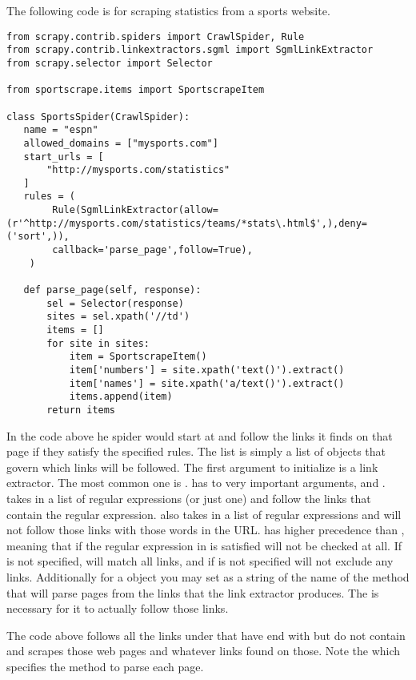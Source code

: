 The following code is for scraping statistics from a sports website.
\begin{lstlisting}
from scrapy.contrib.spiders import CrawlSpider, Rule
from scrapy.contrib.linkextractors.sgml import SgmlLinkExtractor
from scrapy.selector import Selector

from sportscrape.items import SportscrapeItem

class SportsSpider(CrawlSpider):
   name = "espn"
   allowed_domains = ["mysports.com"]
   start_urls = [
       "http://mysports.com/statistics"
   ]
   rules = (
        Rule(SgmlLinkExtractor(allow=(r'^http://mysports.com/statistics/teams/*stats\.html$',),deny=('sort',)),
		callback='parse_page',follow=True),
    )

   def parse_page(self, response):
       sel = Selector(response)
       sites = sel.xpath('//td')
       items = []
       for site in sites:
           item = SportscrapeItem()
           item['numbers'] = site.xpath('text()').extract()
           item['names'] = site.xpath('a/text()').extract()
           items.append(item)
       return items
\end{lstlisting}
In the code above he spider would start at  and follow the links it finds on that page if they satisfy the specified rules. 
The  list is simply a list of  objects that govern which links will be followed. 
The first argument to initialize  is a link extractor.
The most common one is .
 has to very important arguments,  and . 
 takes in a list of regular expressions (or just one) and follow the links that contain the regular expression. 
 also takes in a list of regular expressions and will not follow those links with those words in the URL. 
 has higher precedence than , meaning that if the regular expression in  is satisfied  will not be checked at all. 
If  is not specified,  will match all links, and if  is not specified  will not exclude any links. 
Additionally for a  object you may set  as a string of the name of the method that will parse pages from the links that the link extractor produces. 
The  is necessary for it to actually follow those links.

The code above follows all the links under  that have end with  but do not contain  and scrapes those web pages and whatever links found on those.
Note the  which specifies the  method to parse each page.


